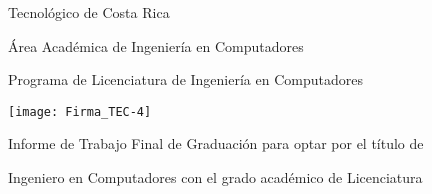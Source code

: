 
\thispagestyle{empty} 

\begin{center}

Tecnológico de Costa Rica

\par\vspace{1ex}

Área Académica de Ingeniería en Computadores

\par\vspace{1ex}

Programa de Licenciatura de Ingeniería en Computadores

\par\vspace{20mm}

\texttt{[image: Firma\_TEC-4]}

\par\vspace*{\fill}

{\large\bf{\scriptTitle}}

\par\vspace*{\fill}

Informe de Trabajo Final de Graduación para optar por el título de

Ingeniero en Computadores con el grado académico de Licenciatura

\par\vspace{20mm}

\scriptAuthor

\vspace*{\fill}

\end{center}
\newpage 
\cleardoublepage 


